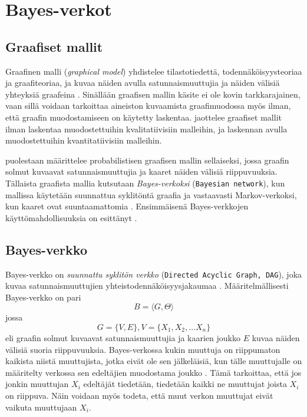 \chapter{Bayes-verkot\label{bayes}} 

\section{Graafiset mallit} 
Graafinen malli (\emph{graphical model}) yhdistelee tilastotiedettä, todennäköisyysteoriaa ja graafiteoriaa, ja kuvaa näiden avulla satunnaismuuttujia ja näiden välisiä yhteyksiä graafeina \citep{jordan_graphical_2004}. Sinällään graafisen mallin käsite ei ole kovin tarkkarajainen, vaan sillä voidaan tarkoittaa aineiston kuvaamista graafimuodossa myös ilman, että graafin muodostamiseen on käytetty laskentaa. \citet{ramsahai_connecting_2020} jaottelee graafiset mallit ilman laskentaa muodostettuihin kvalitatiivisiin malleihin, ja laskennan avulla muodostettuihin kvantitatiivisiin malleihin.  

\citet{jordan_graphical_2004} puolestaan määrittelee probabilistisen graafisen mallin sellaiseksi, jossa graafin solmut kuvaavat satunnaismuuttujia ja kaaret näiden välisiä riippuvuuksia. Tällaista graafista mallia kutsutaan \emph{Bayes-verkoksi} (\texttt{Bayesian network}), kun mallissa käytetään suunnattua syklitöntä graafia ja vastaavasti Markov-verkoksi, kun kaaret ovat suuntaamattomia \citep{ruggeri_bayesian_2008}. Ensimmäisenä Bayes-verkkojen käyttömahdollisuuksia on esittänyt \citet{pearl_fusion_1986}. 

\section{Bayes-verkko}\label{bayes-verkko} 

Bayes-verkko on \emph{suunnattu syklitön verkko} (\texttt{Directed Acyclic Graph, DAG}), joka kuvaa satunnaismuuttujien yhteistodennäköisyysjakaumaa \citep{ruggeri_bayesian_2008}. Määritelmällisesti Bayes-verkko on pari  
$$ 
    B = \langle G, \Theta \rangle 
$$ 
jossa  
$$ 
    G = \{V, E\}, V = \{X_1, X_2,\ldots X_n\}
$$  
eli graafin solmut kuvaavat satunnaismuuttujia ja kaarien joukko $E$ kuvaa näiden välisiä suoria riippuvuuksia. Bayes-verkossa kukin muuttuja on riippumaton kaikista niistä muuttujista, jotka eivät ole sen jälkeläisiä, kun tälle muuttujalle on määritelty verkossa sen edeltäjien muodostama joukko \citep{ruggeri_bayesian_2008}. Tämä tarkoittaa, että jos jonkin muuttujan $X_i$ edeltäjät tiedetään, tiedetään kaikki ne muuttujat joista $X_i$ on riippuva. Näin voidaan myös todeta, että muut verkon muuttujat eivät vaikuta muuttujaan $X_i$.  

